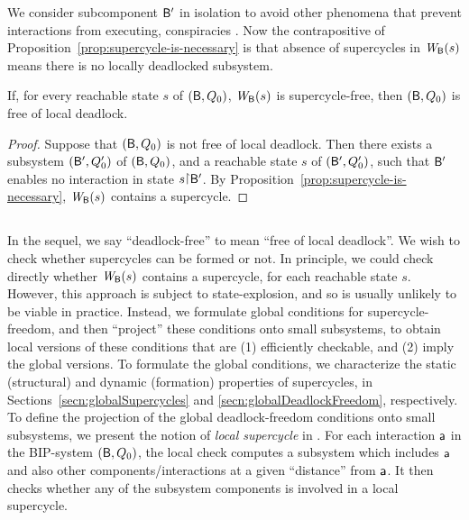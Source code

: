 We consider subcomponent $\mathsf{B}'$ in isolation to avoid other phenomena that prevent interactions from executing, \eg
conspiracies \cite{AFG93}.  
Now the contrapositive of Proposition~\ref{prop:supercycle-is-necessary} is that absence of
supercycles in $\mathit{W}_{\mathsf{B}}({s})$ means there is no locally deadlocked subsystem. 



\begin{corollary}
\label{cor:static:dead-free}
If, for every reachable state $s$ of $(\mathsf{B},Q_0)$, $\mathit{W}_{\mathsf{B}}({s})$ is supercycle-free, then
$(\mathsf{B},Q_0)$ is free of local deadlock.
\end{corollary}
%
\begin{proof}
Suppose that $(\mathsf{B}, Q_0)$ is not free of local deadlock. Then there exists a subsystem $(\mathsf{B}', Q'_0)$ of $(\mathsf{B}, Q_0)$, and
a reachable state $s$ of $(\mathsf{B}', Q'_0)$, such that $\mathsf{B}'$ enables no interaction in state  $s \pj \B'$.
By Proposition~\ref{prop:supercycle-is-necessary}, $\mathit{W}_{\mathsf{B}}({s})$ contains a supercycle.
\end{proof}




\subsection{}


In the sequel, we say ``deadlock-free'' to mean ``free of local deadlock''.  We wish to check whether supercycles can be formed or not.  In principle,
we could check directly whether $\mathit{W}_{\mathsf{B}}({s})$ contains a supercycle, for each reachable state $s$. However, this approach is subject to
state-explosion, and so is usually unlikely to be viable in practice.  Instead, we formulate global conditions for supercycle-freedom, and then
``project'' these conditions onto small subsystems, to obtain local versions of these conditions that are (1) efficiently checkable, and (2) imply the
global versions.  
%
To formulate the global conditions, we characterize the static (structural) and dynamic (formation) properties of supercycles, in
Sections~\ref{secn:globalSupercycles} and \ref{secn:globalDeadlockFreedom}, respectively.
%
To define the projection of the global deadlock-freedom conditions onto small subsystems, 
we present the notion of \emph{local supercycle} in .  %
For each interaction $\mathsf{a}$ in the BIP-system $(\mathsf{B}, Q_0)$, the local check computes a subsystem which includes 
$\mathsf{a}$ and also other components/interactions at a given ``distance''
from $\mathsf{a}$.  It then checks whether any of the subsystem components is involved in a local supercycle.


